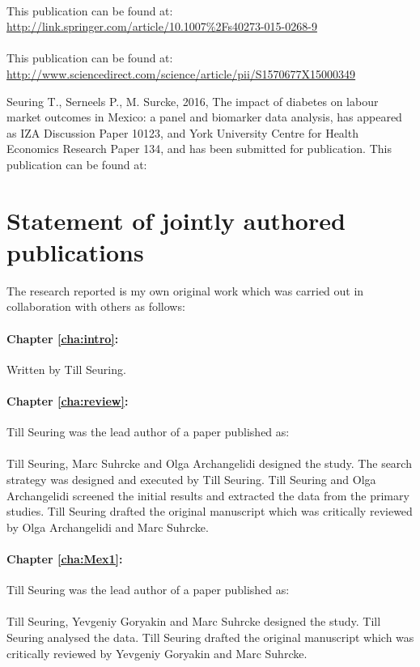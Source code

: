 \noindent {}
\\[12pt]
\noindent This publication can be found at: 
\url{http://link.springer.com/article/10.1007\%2Fs40273-015-0268-9}
\\[12pt]
\noindent {}
\\[12pt]
\noindent This publication can be found at: 
\url{http://www.sciencedirect.com/science/article/pii/S1570677X15000349}

Seuring T., Serneels P., M. Surcke, 2016, The impact of diabetes on labour market outcomes in Mexico: a panel and biomarker data analysis, has appeared as IZA Discussion Paper 10123, and York University Centre for Health Economics Research Paper 134, and has been submitted for publication.
\noindent This publication can be found at: 

\clearpage

\section*{\label{sec:publications}Statement of jointly authored publications}

The research reported is my own original work which was carried out in collaboration with
others as follows:

\paragraph{Chapter \ref{cha:intro}:} Written by Till Seuring. 

\paragraph{Chapter \ref{cha:review}:} Till Seuring was the lead author of a paper published as:
\\[12pt]
\noindent{}
\\[12pt]
\noindent Till Seuring, Marc Suhrcke and Olga Archangelidi designed the study. The search strategy was designed and executed by Till Seuring. Till Seuring and Olga Archangelidi screened the initial results and extracted the data from the primary studies. Till Seuring drafted the original manuscript which was critically reviewed by Olga Archangelidi and Marc Suhrcke.

\paragraph{Chapter \ref{cha:Mex1}:} Till Seuring was the lead author of a paper published as:
\\[12pt]
\noindent{}
\\[12pt]
\noindent Till Seuring, Yevgeniy Goryakin and Marc Suhrcke  designed the study. Till Seuring analysed the data. Till Seuring drafted the original manuscript which was critically reviewed by Yevgeniy Goryakin and Marc Suhrcke.


